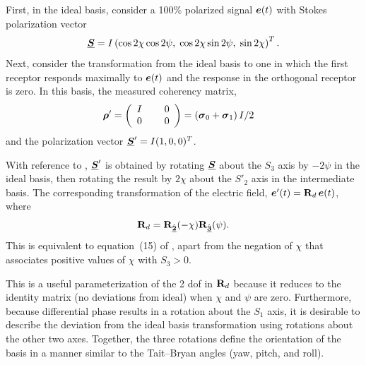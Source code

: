 First, in the ideal basis, consider a 100\% polarized signal $\Jcol{e}(t)$ with Stokes polarization vector
%
\begin{equation}
\Pv{S} = I \left( \cos2\chi  \cos2\psi, \; \cos2\chi  \sin2\psi, \; \sin2\chi \right)^T.
\label{eqn:stokes_vector}
\end{equation}
%
Next, consider the transformation from the ideal basis to one in which the first receptor responds
maximally to $\Jcol{e}(t)$ and the response in the orthogonal receptor is zero.
%
In this basis, the measured coherency matrix,
\begin{equation} \begin{split}
{\cohM{\rho}}'
&= \left( 
	\begin{array}{ccc}
	I & \; & 0 \\
	0 & \; & 0
	\end{array}
	\right)
= \left( \pauli{0} + \pauli{1} \right) I / 2
\end{split} \end{equation}
%
and the polarization vector $\Pv{S}'= I (1,0,0)^T$.

With reference to , $\Pv{S}'$ is obtained by rotating $\Pv{S}$ about the $S_3$ axis by $-2\psi$ in the ideal basis, then rotating the result by $2\chi$ about the $S'_2$ axis in the intermediate basis.  The corresponding
transformation of the electric field, $\Jcol{e}'(t) = \JM{R}_d \, \Jcol{e}(t)$, where
%
\begin{equation}
\label{eqn:orthonormal_spherical}
 \JM{R}_d  = \vRotation[2](-\chi) \vRotation[3](\psi).
\end{equation}
%
This is equivalent to equation~(15) of \citet{bri00}, apart
from the negation of $\chi$ that associates
positive values of $\chi$ with $S_3 > 0$.

This is a useful parameterization of the 2 dof in $\JM{R}_d$ because
it reduces to the identity matrix (no deviations from ideal) when $\chi$ and $\psi$ are zero.
%
Furthermore, because differential phase results in a rotation about the $S_1$ axis, 
it is desirable to describe the deviation from the ideal basis transformation using rotations about the other two axes. Together, the three rotations define the orientation of the basis in a manner similar to the Tait--Bryan angles (yaw, pitch, and roll).

